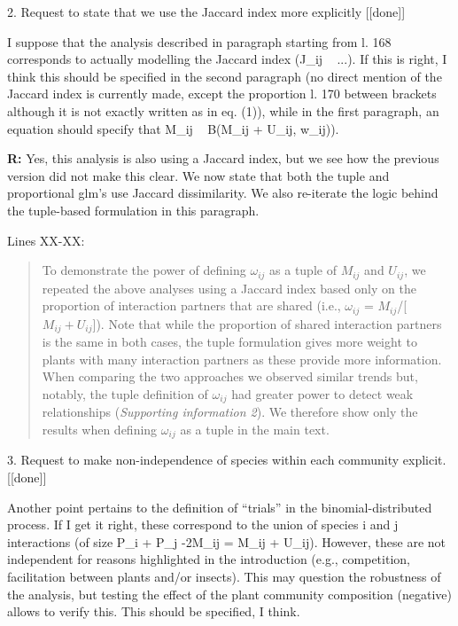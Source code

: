 \documentclass[12pt]{letter}
\newenvironment{refquote}{\bigskip \begin{it}}{\end{it}\smallskip}
\begin{document}
2. Request to state that we use the Jaccard index more explicitly [[done]]

	\begin{refquote}
		I suppose that the analysis described in paragraph starting from l. 168 corresponds to actually modelling the Jaccard index (J_ij ~ ...). If this is right, I think this should be specified in the second paragraph (no direct mention of the Jaccard index is currently made, except the proportion l. 170 between brackets although it is not exactly written as in eq. (1)), while in the first paragraph, an equation should specify that M_ij ~ B(M_ij + U_ij, w_ij)).
	\end{refquote}


	\textbf{R:} Yes, this analysis is also using a Jaccard index, but we see how the previous version did not make this clear. We now state that both the tuple and proportional glm's use Jaccard dissimilarity. We also re-iterate the logic behind the tuple-based formulation in this paragraph.


		Lines XX-XX:


		\begin{quotation}

			To demonstrate the power of defining $\omega_{ij}$ as a tuple of $M_{ij}$ and $U_{ij}$, we repeated the above analyses using a Jaccard index based only on the proportion of interaction partners that are shared (i.e., $\omega_{ij}$ = $M_{ij}$/[$M_{ij}+U_{ij}$]). Note that while the proportion of shared interaction partners is the same in both cases, the tuple formulation gives more weight to plants with many interaction partners as these provide more information. When comparing the two approaches 
		    we observed similar trends but, notably, the tuple definition of $\omega_{ij}$ had greater power to detect weak relationships (\emph{Supporting information 2}). We therefore show only the results when defining $\omega_{ij}$ as a tuple in the main text.

		\end{quotation}


3. Request to make non-independence of species within each community explicit. [[done]]

	\begin{refquote}
		Another point pertains to the definition of “trials” in the binomial-distributed process. If I get it right, these correspond to the union of species i and j interactions (of size P_i + P_j -2M_ij = M_ij + U_ij). However, these are not independent for reasons highlighted in the introduction (e.g., competition, facilitation between plants and/or insects). This may question the robustness of the analysis, but testing the effect of the plant community composition (negative) allows to verify this. This should be specified, I think.
	\end{refquote}
\end{document}
